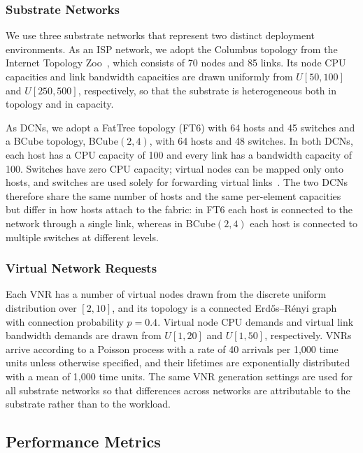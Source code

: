\documentclass{ieeeaccess}
\begin{document}
\subsubsection{Substrate Networks}

We use three substrate networks that represent two distinct deployment environments. As an ISP
network, we adopt the Columbus topology from the Internet Topology Zoo~\cite{knight2011internet},
which consists of 70 nodes and 85 links. Its node CPU capacities and link bandwidth capacities are
drawn uniformly from $U[50,100]$ and $U[250,500]$, respectively, so that the substrate is
heterogeneous both in topology and in capacity.

As DCNs, we adopt a FatTree topology (FT6) with 64 hosts and 45 switches and a BCube topology,
BCube$(2,4)$, with 64 hosts and 48 switches. In both DCNs, each host has a CPU capacity of 100 and
every link has a bandwidth capacity of 100. Switches have zero CPU capacity; virtual nodes can be
mapped only onto hosts, and switches are used solely for forwarding virtual links~\cite{blenk2018neurovine,haeri2016virtual}. The two DCNs
therefore share the same number of hosts and the same per-element capacities but differ in how
hosts attach to the fabric: in FT6 each host is connected to the network through a single link,
whereas in BCube$(2,4)$ each host is connected to multiple switches at different levels.

\subsubsection{Virtual Network Requests}

Each VNR has a number of virtual nodes drawn from the discrete uniform distribution over $[2,10]$,
and its topology is a connected Erd\H{o}s--R\'enyi graph with connection probability $p=0.4$.
Virtual node CPU demands and virtual link bandwidth demands are drawn from $U[1,20]$ and
$U[1,50]$, respectively. VNRs arrive according to a Poisson process with a rate of 40 arrivals per
1{,}000 time units unless otherwise specified, and their lifetimes are exponentially distributed
with a mean of 1{,}000 time units. The same VNR generation settings are used for all substrate
networks so that differences across networks are attributable to the substrate rather than to the
workload.

\subsection{Performance Metrics}
\end{document}
